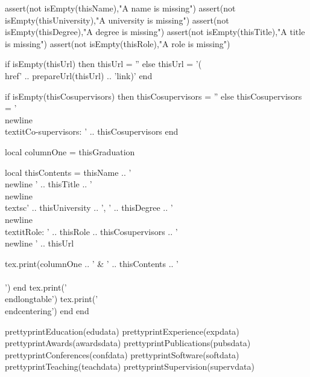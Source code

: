 \documentclass[letterpaper, 10pt]{article}
\begin{document}
\begin{luacode}
				assert(not isEmpty(thisName),"A name is missing")
				assert(not isEmpty(thisUniversity),"A university is missing")
				assert(not isEmpty(thisDegree),"A degree is missing")
				assert(not isEmpty(thisTitle),"A title is missing")
				assert(not isEmpty(thisRole),"A role is missing")

				if isEmpty(thisUrl) then
					thisUrl = ''
				else
					thisUrl = '(\\href{' .. prepareUrl(thisUrl) .. '}{link})'
				end

				if isEmpty(thisCosupervisors) then
					thisCosupervisors = ''
				else
					thisCosupervisors = '\\newline\\textit{Co-supervisors: }' .. thisCosupervisors
				end

				local columnOne = thisGraduation

				local thisContents = thisName ..
									'\\newline ' .. thisTitle ..
									'\\newline\\textsc{' .. thisUniversity .. '}, ' .. thisDegree ..
									'\\newline\\textit{Role: }' .. thisRole ..
									thisCosupervisors ..
									'\\newline ' .. thisUrl

				tex.print(columnOne .. ' & ' .. thisContents .. ' \\\\')
			end
			tex.print('\\end{longtable}')
			tex.print('\\end{centering}')
		end
	end


	prettyprintEducation(edudata)
	prettyprintExperience(expdata)
	prettyprintAwards(awardsdata)
	prettyprintPublications(pubsdata)
	prettyprintConferences(confdata)
	prettyprintSoftware(softdata)
	prettyprintTeaching(teachdata)
	prettyprintSupervision(supervdata)
\end{luacode}
\end{document}
